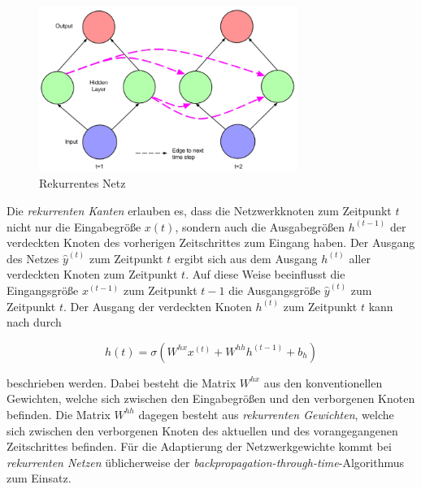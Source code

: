 \begin{figure} [h]
	\centering
	\includegraphics[width=0.75\textwidth]{images/recurrent_net}
	\caption{Rekurrentes Netz \cite{Lipton.5292015}}
	\label{fig:recurrent}
\end{figure}

Die \textit{rekurrenten Kanten} erlauben es, dass die Netzwerkknoten zum Zeitpunkt $t$ nicht nur die Eingabegröße $x(t)$, sondern auch die Ausgabegrößen $h^{(t-1)}$ der verdeckten Knoten des vorherigen Zeitschrittes zum Eingang haben. Der Ausgang des Netzes $\hat{y}^{(t)}$ zum Zeitpunkt $t$ ergibt sich aus dem Ausgang $h^{(t)}$ aller verdeckten Knoten zum Zeitpunkt $t$. Auf diese Weise beeinflusst die Eingangsgröße $x^{(t-1)}$ zum Zeitpunkt $t-1$ die Ausgangsgröße $\hat{y}^{(t)}$ zum Zeitpunkt $t$. Der Ausgang der verdeckten Knoten $h^{(t)}$ zum Zeitpunkt $t$ kann nach \cite{Lipton.5292015} durch 

\begin{equation}
h(t) = \sigma(W^{hx}x^{(t)} + W^{hh}h^{(t-1)} + b_h)
\end{equation}

beschrieben werden. Dabei besteht die Matrix $W^{hx}$ aus den konventionellen Gewichten, welche sich zwischen den Eingabegrößen und den verborgenen Knoten befinden. Die Matrix $W^{hh}$ dagegen besteht aus \textit{rekurrenten Gewichten}, welche sich zwischen den verborgenen Knoten des aktuellen und des vorangegangenen Zeitschrittes befinden. Für die Adaptierung der Netzwerkgewichte kommt bei \textit{rekurrenten Netzen} üblicherweise der \textit{backpropagation-through-time}-Algorithmus zum Einsatz. \cite{Lipton.5292015}












 


 
